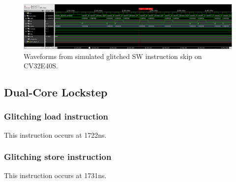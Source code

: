 \begin{figure}[h!]
    \centering
    \includegraphics[width=\textwidth]{docs/images/sw_glitch_single_core.png}
    \caption{Waveforms from simulated glitched SW instruction skip on CV32E40S.}
    \label{fig:sw_glitch_single_wave}
\end{figure}


\subsection{Dual-Core Lockstep}

\subsubsection{Glitching load instruction}

This instruction occurs at 1722ns. 

\subsubsection{Glitching store instruction}

This instruction occurs at 1731ns.